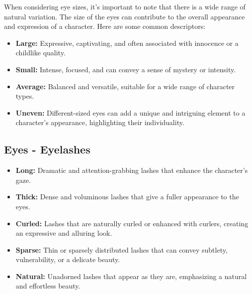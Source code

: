 \documentclass[12pt]{book}  %
\begin{document}
When considering eye sizes, it's important to note that there is a wide range of natural variation. The size of the eyes can contribute to the overall appearance and expression of a character. Here are some common descriptors:

\begin{itemize}
    \item \textbf{Large:} Expressive, captivating, and often associated with innocence or a childlike quality.
    \item \textbf{Small:} Intense, focused, and can convey a sense of mystery or intensity.
    \item \textbf{Average:} Balanced and versatile, suitable for a wide range of character types.
    \item \textbf{Uneven:} Different-sized eyes can add a unique and intriguing element to a character's appearance, highlighting their individuality.
\end{itemize}

\subsection{\textbf{Eyes - Eyelashes}}

\begin{itemize}
    \item \textbf{Long:} Dramatic and attention-grabbing lashes that enhance the character's gaze.
    \item \textbf{Thick:} Dense and voluminous lashes that give a fuller appearance to the eyes.
    \item \textbf{Curled:} Lashes that are naturally curled or enhanced with curlers, creating an expressive and alluring look.
    \item \textbf{Sparse:} Thin or sparsely distributed lashes that can convey subtlety, vulnerability, or a delicate beauty.
    \item \textbf{Natural:} Unadorned lashes that appear as they are, emphasizing a natural and effortless beauty.
\end{itemize}
\end{document}
